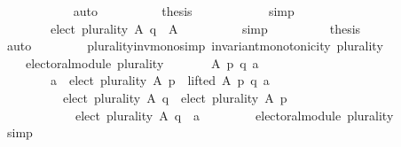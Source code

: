 \begin{isabellebody}
\ \ \ \ \ \ \ \ \ \ \isamarkupfalse%
\ auto\isanewline
\ \ \ \ \ \ \ \ \isamarkupfalse%
\ {\isacharquery}{\kern0pt}thesis\isanewline
\ \ \ \ \ \ \ \ \ \ \isamarkupfalse%
\ simp\isanewline
\ \ \ \ \ \ \isamarkupfalse%
\isanewline
\ \ \ \ \ \ \isamarkupfalse%
\ \isamarkupfalse%
\isanewline
\ \ \ \ \ \ \ \ {\isachardoublequoteopen}elect\ plurality\ A\ q\ {\isasymsubseteq}\ A{\isachardoublequoteclose}\isanewline
\ \ \ \ \ \ \ \ \isamarkupfalse%
\ simp\isanewline
\ \ \ \ \ \ \isamarkupfalse%
\ \isamarkupfalse%
\ {\isacharquery}{\kern0pt}thesis\isanewline
\ \ \ \ \ \ \ \ \isamarkupfalse%
\ auto\isanewline
\ \ \ \ \isamarkupfalse%
\isanewline
\ \ \isamarkupfalse%
\isanewline
{}\isamarkupfalse%
%
\endisatagproof
{\isafoldproof}%
%
\isadelimproof
\isanewline
%
\endisadelimproof
\isanewline
\isanewline
{}\isamarkupfalse%
\ plurality{\isacharunderscore}{\kern0pt}inv{\isacharunderscore}{\kern0pt}mono{\isacharbrackleft}{\kern0pt}simp{\isacharbrackright}{\kern0pt}{\isacharcolon}{\kern0pt}\ {\isachardoublequoteopen}invariant{\isacharunderscore}{\kern0pt}monotonicity\ plurality{\isachardoublequoteclose}\isanewline
%
\isadelimproof
%
\endisadelimproof
%
\isatagproof
{}\isamarkupfalse%
\ {\isacharminus}{\kern0pt}\isanewline
\ \ \isamarkupfalse%
\isanewline
\ \ \ \ {\isachardoublequoteopen}electoral{\isacharunderscore}{\kern0pt}module\ plurality\ {\isasymand}\isanewline
\ \ \ \ \ \ {\isacharparenleft}{\kern0pt}{\isasymforall}A\ p\ q\ a{\isachardot}{\kern0pt}\isanewline
\ \ \ \ \ \ \ \ {\isacharparenleft}{\kern0pt}a\ {\isasymin}\ elect\ plurality\ A\ p\ {\isasymand}\ lifted\ A\ p\ q\ a{\isacharparenright}{\kern0pt}\ {\isasymlongrightarrow}\isanewline
\ \ \ \ \ \ \ \ \ \ {\isacharparenleft}{\kern0pt}elect\ plurality\ A\ q\ {\isacharequal}{\kern0pt}\ elect\ plurality\ A\ p\ {\isasymor}\isanewline
\ \ \ \ \ \ \ \ \ \ \ \ elect\ plurality\ A\ q\ {\isacharequal}{\kern0pt}\ {\isacharbraceleft}{\kern0pt}a{\isacharbraceright}{\kern0pt}{\isacharparenright}{\kern0pt}{\isacharparenright}{\kern0pt}{\isachardoublequoteclose}\isanewline
\ \ \isamarkupfalse%
\isanewline
\ \ \ \ \isamarkupfalse%
\ {\isachardoublequoteopen}electoral{\isacharunderscore}{\kern0pt}module\ plurality{\isachardoublequoteclose}\isanewline
\ \ \ \ \ \ \isamarkupfalse%
\ simp\isanewline
\ \ \isamarkupfalse%

\end{isabellebody}
